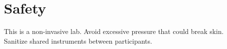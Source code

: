 \section{Safety}
This is a non-invasive lab. Avoid excessive pressure that could break skin. Sanitize shared instruments between participants.
